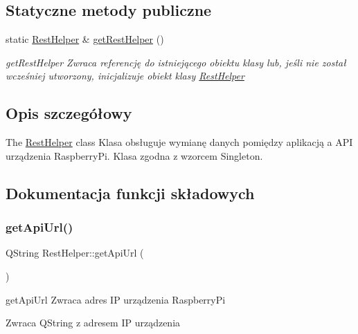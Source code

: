 \subsection*{Statyczne metody publiczne}
\begin{DoxyCompactItemize}
\item 
static \mbox{\hyperlink{class_rest_helper}{Rest\+Helper}} \& \mbox{\hyperlink{class_rest_helper_aac5e384d8056c0d4a6398e83963fb2bf}{get\+Rest\+Helper}} ()
\begin{DoxyCompactList}\small\item\em get\+Rest\+Helper Zwraca referencję do istniejącego obiektu klasy lub, jeśli nie został wcześniej utworzony, inicjalizuje obiekt klasy \mbox{\hyperlink{class_rest_helper}{Rest\+Helper}} \end{DoxyCompactList}\end{DoxyCompactItemize}


\subsection{Opis szczegółowy}
The \mbox{\hyperlink{class_rest_helper}{Rest\+Helper}} class Klasa obsługuje wymianę danych pomiędzy aplikacją a A\+PI urządzenia Raspberry\+Pi. Klasa zgodna z wzorcem Singleton. 

\subsection{Dokumentacja funkcji składowych}
\mbox{\label{class_rest_helper_ad6c71fc30c6377e10f465038b6b06c4c}} 
\subsubsection{\texorpdfstring{get\+Api\+Url()}{getApiUrl()}}
{\footnotesize\ttfamily Q\+String Rest\+Helper\+::get\+Api\+Url (\begin{DoxyParamCaption}{ }\end{DoxyParamCaption})}



get\+Api\+Url Zwraca adres IP urządzenia Raspberry\+Pi 

\begin{DoxyReturn}{Zwraca}
Q\+String z adresem IP urządzenia 
\end{DoxyReturn}
\mbox{\label{class_rest_helper_ac4de88ea9cfe823ca317c87e99729b8c}} 
